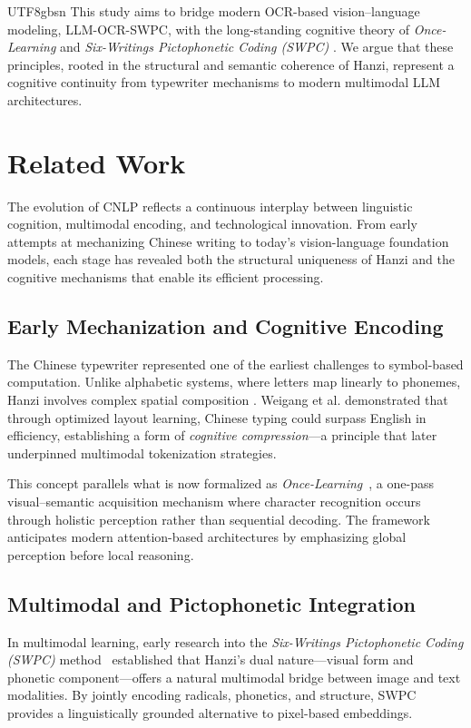\documentclass[conference]{IEEEtran}
\begin{document}
\begin{CJK*}{UTF8}{gbsn}
This study aims to bridge modern OCR-based vision–language modeling, LLM-OCR-SWPC, with the long-standing cognitive theory of \textit{Once-Learning} \cite{weigang1999study,althoff2022once} and \textit{Six-Writings Pictophonetic Coding (SWPC)} \cite{weigang2024six}. We argue that these principles, rooted in the structural and semantic coherence of Hanzi, represent a cognitive continuity from typewriter mechanisms to modern multimodal LLM architectures.

\section{Related Work}
\label{sec:relatedwork}

The evolution of CNLP reflects a continuous interplay between linguistic cognition, multimodal encoding, and technological innovation. From early attempts at mechanizing Chinese writing to today’s vision-language foundation models, each stage has revealed both the structural uniqueness of Hanzi and the cognitive mechanisms that enable its efficient processing.

\subsection{Early Mechanization and Cognitive Encoding}
The Chinese typewriter represented one of the earliest challenges to symbol-based computation. Unlike alphabetic systems, where letters map linearly to phonemes, Hanzi involves complex spatial composition \cite{mullaney2017chinese}. Weigang et al. \cite{weigang2022typewriter} demonstrated that through optimized layout learning, Chinese typing could surpass English in efficiency, establishing a form of \textit{cognitive compression}---a principle that later underpinned multimodal tokenization strategies. 

This concept parallels what is now formalized as \textit{Once-Learning}~\citep{weigang1999study,weigang2022hol,althoff2022once}, a one-pass visual–semantic acquisition mechanism where character recognition occurs through holistic perception rather than sequential decoding. The framework anticipates modern attention-based architectures \cite{vaswani2017attention} by emphasizing global perception before local reasoning.

\subsection{Multimodal and Pictophonetic Integration}
In multimodal learning, early research into the \textit{Six-Writings Pictophonetic Coding (SWPC)} method~\citep{weigang2024six} established that Hanzi’s dual nature---visual form and phonetic component---offers a natural multimodal bridge between image and text modalities. By jointly encoding radicals, phonetics, and structure, SWPC provides a linguistically grounded alternative to pixel-based embeddings. 


\end{CJK*}
\end{document}
